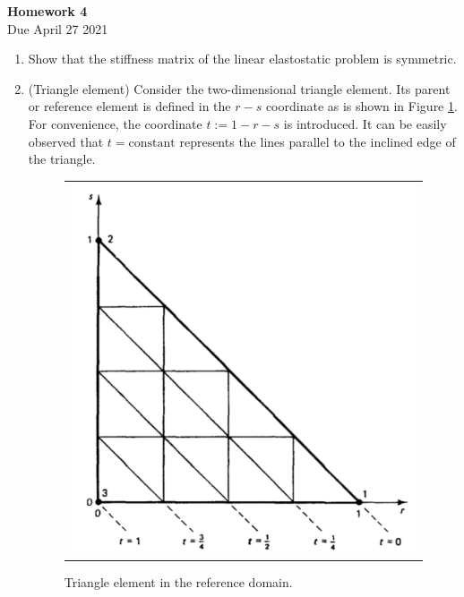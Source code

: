 \documentclass[12pt]{article}
\begin{document}
\begin{center}
\textbf{\Large
Homework 4
}\\
\normalsize Due April 27 2021





\end{center}
\begin{enumerate}
\item Show that the stiffness matrix of the linear elastostatic problem is symmetric.

\item (Triangle element) Consider the two-dimensional triangle element. Its parent or reference element is defined in the $r-s$ coordinate as is shown in Figure \ref{fig:tri}. For convenience, the coordinate $t := 1 - r - s$ is introduced. It can be easily observed that $t= \mathrm{constant}$ represents the lines parallel to the inclined edge of the triangle.

\begin{figure}[h]
	\begin{center}
	\begin{tabular}{c}
\includegraphics[angle=0, trim=0 0 0 0, clip=true, scale = 0.35]{./triangle_elem.pdf}
\end{tabular}
\end{center} 
\caption{Triangle element in the reference domain.}
\label{fig:tri}
\end{figure}


\end{enumerate}
\end{document}
